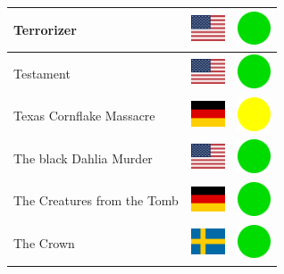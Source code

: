 \documentclass[12pt, a4paper, twoside]{report}
\begin{document}
\begin{center}
\begin{longtable}{|p{5cm}|p{2cm}|p{2cm}|}
 Terrorizer                                                 & \includegraphics[width=1cm]{../4x3/us} &   \includegraphics[width=1cm]{../likes/y} \\ \hline
 Testament                                                  & \includegraphics[width=1cm]{../4x3/us} &   \includegraphics[width=1cm]{../likes/y} \\ \hline
 Texas Cornflake Massacre                                   & \includegraphics[width=1cm]{../4x3/de} &   \includegraphics[width=1cm]{../likes/m} \\ \hline
 The black Dahlia Murder                                    & \includegraphics[width=1cm]{../4x3/us} &   \includegraphics[width=1cm]{../likes/y} \\ \hline
 The Creatures from the Tomb                                & \includegraphics[width=1cm]{../4x3/de} &   \includegraphics[width=1cm]{../likes/y} \\ \hline
 The Crown                                                  & \includegraphics[width=1cm]{../4x3/se} &   \includegraphics[width=1cm]{../likes/y} \\ \hline

\end{longtable}
\end{center}
\end{document}
